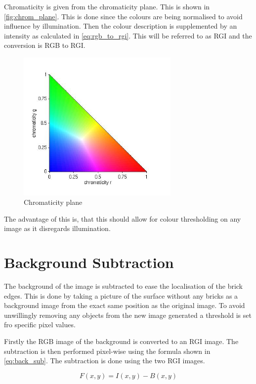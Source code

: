 Chromaticity is given from the chromaticity plane. This is shown in \autoref{fig:chrom_plane}. This is done since the colours are being normalised to avoid influence by illumination. Then the colour description is supplemented by an intensity as calculated in \autoref{eq:rgb_to_rgi}. This will be referred to as RGI and the conversion is RGB to RGI.


\begin{figure}[H]
	\centering
	\includegraphics[width=0.7\textwidth]{figures/chrom_plane}
	\caption{Chromaticity plane}
	\label{fig:chrom_plane}
\end{figure}

The advantage of this is, that this should allow for colour thresholding on any image as it disregards illumination.

\section{Background Subtraction}
The background of the image is subtracted to ease the localisation of the brick edges. This is done by taking a picture of the surface without any bricks as a background image from the exact same position as the original image.
To avoid unwillingly removing any objects from the new image generated a threshold is set fro specific pixel values.

Firstly the RGB image of the background is converted to an RGI image. The subtraction is then performed pixel-wise using the formula shown in \autoref{eq:back_sub}. The subtraction is done using the two RGI images.

\begin{equation}\label{eq:back_sub}
	F(x,y) = I(x,y) - B(x,y)
\end{equation}

